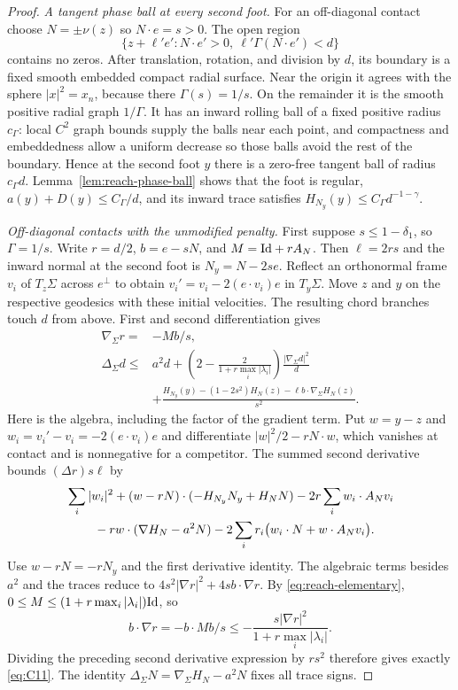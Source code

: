 \begin{proof}
\emph{A tangent phase ball at every second foot.}
For an off-diagonal contact choose $N=\pm\nu(z)$ so $N\cdot e=s>0$.
The open region
\[
 \{z+\ell'e':N\cdot e'>0,\ \ell'\Gamma(N\cdot e')<d\}
\]
contains no zeros.  After translation, rotation, and division by $d$,
its boundary is a fixed smooth embedded compact radial surface.  Near
the origin it agrees with the sphere $|x|^2=x_n$, because there
$\Gamma(s)=1/s$.  On the remainder it is the smooth positive radial
graph $1/\Gamma$.  It has an inward rolling ball of a fixed positive
radius $c_\Gamma$: local $C^2$ graph bounds supply the balls near
each point, and compactness and embeddedness allow a uniform
decrease so those balls avoid the rest of the boundary.  Hence at
the second foot $y$ there is a zero-free tangent ball of radius
$c_\Gamma d$.  Lemma~\ref{lem:reach-phase-ball} shows that the foot
is regular, $a(y)+D(y)\le C_\Gamma/d$, and its inward trace satisfies
$H_{N_y}(y)\le C_\Gamma d^{-1-\gamma}$.

\emph{Off-diagonal contacts with the unmodified penalty.}
First suppose $s\le1-\delta_1$, so $\Gamma=1/s$.  Write
$r=d/2$, $b=e-sN$, and $M=\mathrm{Id}+rA_N$.  Then $\ell=2rs$ and the
inward normal at the second foot is $N_y=N-2se$.
Reflect an orthonormal frame $v_i$ of $T_z\Sigma$ across $e^\perp$
to obtain $v_i'=v_i-2(e\cdot v_i)e$ in $T_y\Sigma$.  Move $z$ and
$y$ on the respective geodesics with these initial velocities.
The resulting chord branches touch $d$ from above.  First and second
differentiation gives
\begin{equation}\label{eq:C11}
 \begin{split}
 \nabla_\Sigma r={}&-Mb/s,\\
 \Delta_\Sigma d\le{}&a^2d+
 \left(2-\frac2{1+r\max_i|\lambda_i|}\right)
             \frac{|\nabla_\Sigma d|^2}{d}\\
 &+\frac{H_{N_y}(y)-(1-2s^2)H_N(z)
                -\ell b\cdot\nabla_\Sigma H_N(z)}{s^2}.
 \end{split}
\end{equation}
Here is the algebra, including the factor of the gradient term.
Put $w=y-z$ and $w_i=v_i'-v_i=-2(e\cdot v_i)e$ and differentiate
$|w|^2/2-rN\cdot w$, which vanishes at contact and is nonnegative
for a competitor.  The summed second derivative bounds
$(\Delta r)s\ell$ by
\[
 \begin{split}
 &\sum_i|w_i|^2+(w-rN)\cdot(-H_{N_y}N_y+H_NN)
 -2r\sum_iw_i\cdot A_Nv_i\\
 &\hspace{8mm}-rw\cdot(\nabla H_N-a^2N)
 -2\sum_i r_i\bigl(w_i\cdot N+w\cdot A_Nv_i\bigr).
 \end{split}
\]
Use $w-rN=-rN_y$ and the first derivative identity.
The algebraic terms besides $a^2$ and the traces reduce to
$4s^2|\nabla r|^2+4s b\cdot\nabla r$.  By
\eqref{eq:reach-elementary}, $0\le M\le
(1+r\max_i|\lambda_i|)\mathrm{Id}$, so
\[
 b\cdot\nabla r=-b\cdot Mb/s
 \le-\frac{s|\nabla r|^2}{1+r\max_i|\lambda_i|}.
\]
Dividing the preceding second derivative expression by $rs^2$
therefore gives exactly \eqref{eq:C11}.  The identity
$\Delta_\Sigma N=\nabla_\Sigma H_N-a^2N$ fixes all trace signs.


\end{proof}
